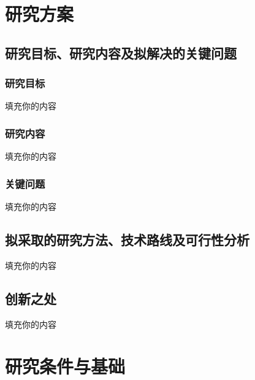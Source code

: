 \documentclass[
    UTF8,
    twoside,
    zihao=5,
    scheme=plain,
    heading=true,
]{ctexrep}
\theoremstyle{plain}
\theoremstyle{definition}
\theoremstyle{remark}
\begin{document}
\chapter{研究方案}

\begin{framed}
\begin{spacing}{1.5}

\section{研究目标、研究内容及拟解决的关键问题}

\subsection{研究目标}

填充你的内容

\subsection{研究内容}

填充你的内容

\subsection{关键问题}

填充你的内容

\section{拟采取的研究方法、技术路线及可行性分析}

填充你的内容

\section{创新之处}

填充你的内容

\end{spacing}
\end{framed}
\newpage

\chapter{研究条件与基础}
\end{document}
